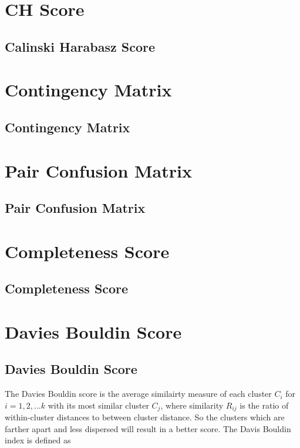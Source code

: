\clearpage
\thispagestyle{clusteringstyle}
\section{CH Score}
\subsection{Calinski Harabasz Score}


\clearpage
\thispagestyle{clusteringstyle}
\section{Contingency Matrix}
\subsection{Contingency Matrix}

\clearpage
\thispagestyle{clusteringstyle}
\section{Pair Confusion Matrix}
\subsection{Pair Confusion Matrix}

\clearpage
\thispagestyle{clusteringstyle}
\section{Completeness Score}
\subsection{Completeness Score}

\clearpage
\thispagestyle{clusteringstyle}
\section{Davies Bouldin Score}
\subsection{Davies Bouldin Score}

The Davies Bouldin score is the average similairty measure of each cluster $C_{i}$ for $i = 1,2,...k$  with its most similar cluster $C_{j}$, where similarity $R_{ij}$ is the ratio of within-cluster distances to between cluster distance. So the clusters which are farther apart and less dispersed will result in a better score. The Davis Bouldin index is defined as 

